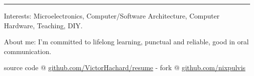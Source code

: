 \documentclass[10pt,letterpaper]{article}
\newenvironment{indentsection}[1]
{\begin{list}{}
  {\setlength{\leftmargin}{#1}} \item[]
}
{\end{list}}
\begin{document}
\hrule
\begin{indentsection}{\parindent}
\begin{description*}
\item[Interests:]
  Microelectronics, Computer/Software Architecture, Computer Hardware, Teaching,
  DIY.
\item[About me:]
  I’m committed to lifelong learning, punctual and reliable,
  good in oral communication.
\end{description*}
\end{indentsection}


\begin{center}
\footnotesize source code @
\href{http://www.github.com/VictorHachard/resume}
{github.com/VictorHachard/resume} - fork @
\href{http://www.github.com/nixpulvis}
{github.com/nixpulvis}
\end{center}
\end{document}
